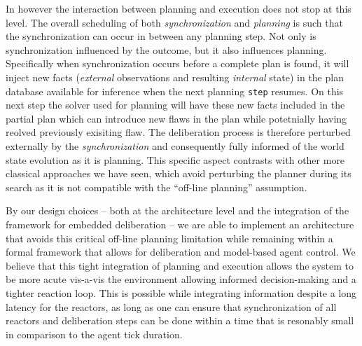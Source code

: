 In \rx however the interaction between planning and execution does not
stop at this level. The overall scheduling of both {\em
  synchronization} and {\em planning} is such that the synchronization
can occur in between any planning step. Not only is synchronization
influenced by the outcome, but it also influences
planning. Specifically when synchronization occurs before a complete
plan is found, it will inject new facts ({\em external} observations
and resulting {\em internal} state) in the plan database available for
inference when the next planning \texttt{step} resumes. On this next
step the \eu solver used for planning will have these new facts
included in the partial plan which can introduce new flaws in the plan
while potetnially having reolved previously exisiting flaw. The
deliberation process is therefore perturbed externally by the {\em
  synchronization} and consequently fully informed of the world state
evolution as it is planning.  This specific aspect contrasts with
other more classical approaches we have seen, which avoid 
perturbing the planner during its search as it is not compatible 
with the ``off-line planning'' assumption.

By our design choices -- both at the architecture level and the
integration of the \eu framework for embedded deliberation -- we are
able to implement an architecture that avoids this critical off-line
planning limitation while remaining within a formal framework that
allows for deliberation and model-based agent control. We believe that
this tight integration of planning and execution allows the system to
be more acute vis-a-vis the environment allowing informed
decision-making and a tighter reaction loop. This is possible while
integrating information despite a long latency for the reactors, as
long as one can ensure that synchronization of all reactors and
deliberation steps can be done within a time that is resonably small
in comparison to the agent tick duration.








